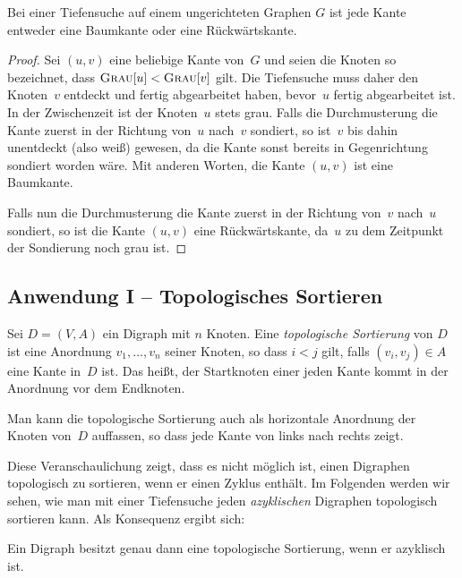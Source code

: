 \begin{thm}
Bei einer Tiefensuche auf einem ungerichteten Graphen $G$ ist jede Kante entweder eine Baumkante oder eine Rückwärtskante.
\end{thm}

\begin{proof}
Sei $(u,v)$ eine beliebige Kante von~$G$ und seien die Knoten so bezeichnet, dass $\mathop{\text{\textsc{Grau}}}[u] < \mathop{\text{\textsc{Grau}}}[v]$ gilt.
Die Tiefensuche muss daher den Knoten~$v$ entdeckt und fertig abgearbeitet haben, bevor~$u$ fertig abgearbeitet ist.
In der Zwischenzeit ist der Knoten~$u$ stets grau.
Falls die Durchmusterung die Kante zuerst in der Richtung von~$u$ nach~$v$ sondiert, so ist~$v$ bis dahin unentdeckt (also weiß) gewesen, da die Kante sonst bereits in Gegenrichtung sondiert worden wäre.
Mit anderen Worten, die Kante $(u,v)$ ist eine Baumkante.

Falls nun die Durchmusterung die Kante zuerst in der Richtung von~$v$ nach~$u$ sondiert, so ist die Kante $(u,v)$ eine Rückwärtskante, da~$u$ zu dem Zeitpunkt der Sondierung noch grau ist.
\end{proof}




\subsection{Anwendung I -- Topologisches Sortieren}

\begin{defn} 
Sei $D=(V,A)$ ein Digraph mit $n$ Knoten.
Eine \emph{topologische Sortierung} von $D$ ist eine Anordnung $v_1,\ldots,v_n$ seiner Knoten, so dass $i < j$ gilt, falls $(v_i,v_j) \in A$ eine Kante in~$D$ ist.
Das heißt, der Startknoten einer jeden Kante kommt in der Anordnung vor dem Endknoten.
\end{defn} 

\begin{bem}
Man kann die topologische Sortierung auch als horizontale Anordnung der Knoten von~$D$ auffassen, so dass jede Kante von links nach rechts zeigt.

Diese Veranschaulichung zeigt, dass es nicht möglich ist, einen Digraphen topologisch zu sortieren, wenn er einen Zyklus enthält.
Im Folgenden werden wir sehen, wie man mit einer Tiefensuche jeden \emph{azyklischen} Digraphen topologisch sortieren kann.
Als Konsequenz ergibt sich:
\end{bem} 

\begin{prop}
Ein Digraph besitzt genau dann eine topologische Sortierung, wenn er azyklisch ist.
\end{prop}

